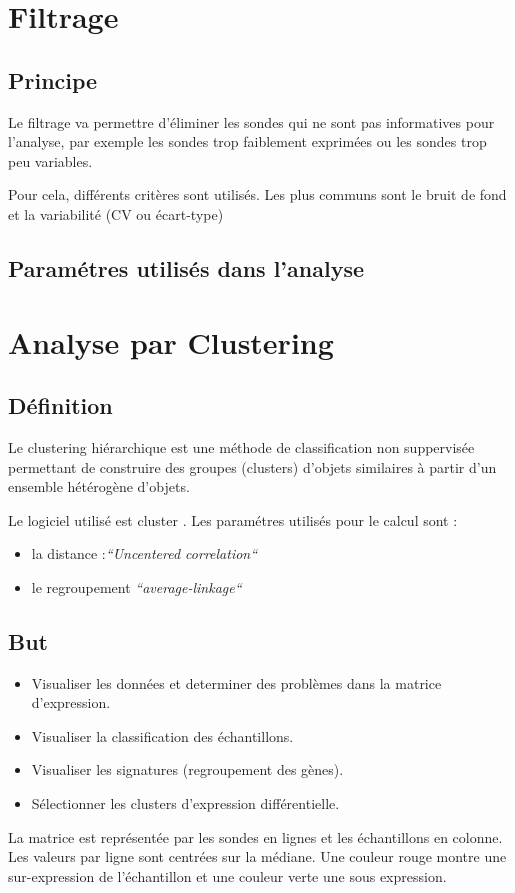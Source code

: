 \documentclass[a4paper]{article}
\begin{document}
\section{Filtrage}
\subsection{Principe}

Le filtrage va permettre d'éliminer les sondes qui ne sont pas informatives pour l'analyse, par exemple les sondes trop faiblement exprimées ou les sondes trop peu variables.
\par
Pour cela, différents critères sont utilisés. Les plus communs sont le bruit de fond et la variabilité (CV ou écart-type)
\subsection{Paramétres utilisés dans l'analyse}



\section{Analyse par Clustering}
\subsection{Définition}
Le clustering hiérarchique est une méthode de classification non suppervisée permettant de construire des groupes (clusters) d'objets similaires à partir d'un ensemble hétérogène d'objets.
\par
\vspace{1em}
Le logiciel utilisé est cluster \cite{cluster} . Les paramétres utilisés pour le calcul sont : 
\begin{itemize} 
	\item la distance :\emph{``Uncentered correlation``} 
	\item le regroupement \emph{``average-linkage``}
\end{itemize}
 
\subsection{But}
\begin{itemize}
\item Visualiser les données et determiner des problèmes dans la matrice d'expression.
\item Visualiser la classification des échantillons.
\item Visualiser les signatures (regroupement des gènes).
\item Sélectionner les clusters d'expression différentielle.
\end{itemize}
La matrice est représentée par les sondes en lignes et les échantillons en colonne. Les valeurs par ligne sont centrées sur la médiane. Une couleur rouge montre une sur-expression de l'échantillon et une couleur verte une sous expression.
%
\end{document}

